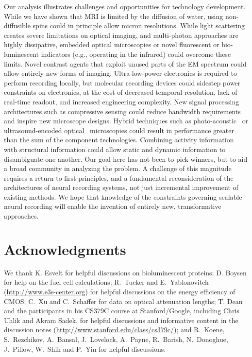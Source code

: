 Our analysis illustrates challenges and opportunities for technology development.
While we have shown that MRI is limited by the diffusion of water, using non-diffusible spins could in principle allow micron resolutions.
While light scattering creates severe limitations on optical imaging, and multi-photon approaches are highly dissipative, embedded optical microscopies or novel fluorescent or bio-luminescent indicators (e.g., operating in the infrared) could overcome these limits.
Novel contrast agents that exploit unused parts of the EM spectrum could allow entirely new forms of imaging.
Ultra-low-power electronics is required to perform recording locally, but molecular recording devices could sidestep power constraints on electronics, at the cost of decreased temporal resolution, lack of real-time readout, and increased engineering complexity.
New signal processing architectures such as compressive sensing could reduce bandwidth requirements and inspire new microscope designs.
Hybrid techniques such as photo-acoustic~\cite{filonov12} or ultrasound-encoded optical~\cite{wang12} microscopies could result in performance greater than the sum of the component technologies.
Combining activity information with structural information could allow static and dynamic information to disambiguate one another.
Our goal here has not been to pick winners, but to aid a broad community in analyzing the problem.
A challenge of this magnitude requires a return to first principles, and a fundamental reconsideration of the architectures of neural recording systems, not just incremental improvement of existing methods.
We hope that knowledge of the constraints governing scalable neural recording will enable the invention of entirely new, transformative approaches.

\section{Acknowledgments}

We thank K. Esvelt for helpful discussions on bioluminescent proteins; D. Boysen for help on the fuel cell calculations; R.~Tucker and E.~Yablonovitch (\url{http://www.e3s-center.org}) for helpful discussions on the energy efficiency of CMOS; C.~Xu and C.~Schaffer for data on optical attenuation lengths; T. Dean and the participants in his CS379C course at Stanford/Google, including Chris Uhlik and Akram Sadek, for helpful discussions and informative content in the discussion notes (\url{http://www.stanford.edu/class/cs379c/}); and R.~Koene, S.~Rezchikov, A.~Bansal, J.~Lovelock, A.~Payne, R.~Barish, N.~Donoghue, J.~Pillow, W.~Shih and P.~Yin for helpful discussions.

